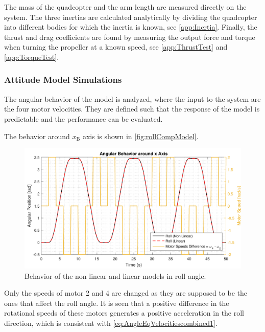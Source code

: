 The mass of the quadcopter and the arm length are measured directly on the system. The three inertias are calculated analytically by dividing the quadcopter into different bodies for which the inertia is known, see \autoref{app:Inertia}. Finally, the thrust and drag coefficients are found by measuring the output force and torque when turning the propeller at a known speed, see \autoref{app:ThrustTest} and \ref{app:TorqueTest}.
\subsubsection{Attitude Model Simulations}
The angular behavior of the model is analyzed, where the input to the system are the four motor velocities. They are defined such that the response of the model is predictable and the performance can be evaluated.

The behavior around $x_{\mathrm{B}}$ axis is shown in \autoref{fig:rollCompModel}. 
\vspace{-0.4 cm}
\begin{figure}[H]
	\centering
	\includegraphics[scale=0.62]{figures/rollCompModel}
	\caption{Behavior of the non linear and linear models in roll angle.}
	\label{fig:rollCompModel}
\end{figure}\vspace{-0.8 cm}
Only the speeds of motor 2 and 4 are changed as they are supposed to be the ones that affect the roll angle. It is seen that a positive difference in the rotational speeds of these motors generates a positive acceleration in the roll direction, which is consistent with \autoref{eq:AngleEqVelocitiescombined1}.

